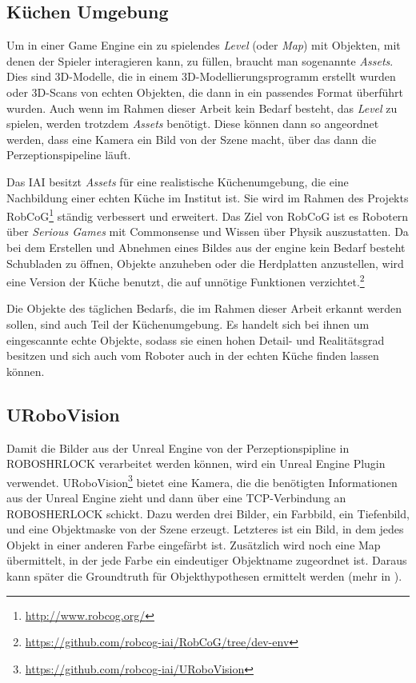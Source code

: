 \subsection{Küchen Umgebung}
\label{subsec:kitchenenvironment}
Um in einer Game Engine ein zu spielendes \textit{Level} (oder \textit{Map}) mit Objekten, mit denen der Spieler interagieren kann, zu füllen, braucht man sogenannte \textit{Assets}. Dies sind 3D-Modelle, die in einem 3D-Modellierungsprogramm erstellt wurden oder 3D-Scans von echten Objekten, die dann in ein passendes Format überführt wurden. Auch wenn im Rahmen dieser Arbeit kein Bedarf besteht, das \textit{Level} zu spielen, werden trotzdem \textit{Assets} benötigt. Diese können dann so angeordnet werden, dass eine Kamera ein Bild von der Szene macht, über das dann die Perzeptionspipeline läuft. \par
Das IAI besitzt \textit{Assets} für eine realistische Küchenumgebung, die eine Nachbildung einer echten Küche im Institut ist. Sie wird im Rahmen des Projekts RobCoG\footnote{\url{http://www.robcog.org/}} ständig verbessert und erweitert. Das Ziel von RobCoG ist es Robotern über \textit{Serious Games} mit Commonsense und Wissen über Physik auszustatten. Da bei dem Erstellen und Abnehmen eines Bildes aus der \acrshort{engine} kein Bedarf besteht Schubladen zu öffnen, Objekte anzuheben oder die Herdplatten anzustellen, wird eine Version der Küche benutzt, die auf unnötige Funktionen verzichtet.\footnote{\url{https://github.com/robcog-iai/RobCoG/tree/dev-env}} \par
Die Objekte des täglichen Bedarfs, die im Rahmen dieser Arbeit erkannt werden sollen, sind auch Teil der Küchenumgebung. Es handelt sich bei ihnen um eingescannte echte Objekte, sodass sie einen hohen Detail- und Realitätsgrad besitzen und sich auch vom Roboter auch in der echten Küche finden lassen können.
 
\subsection{URoboVision}
\label{subsec:urobovision}
Damit die Bilder aus der Unreal Engine von der Perzeptionspipline in ROBOSHRLOCK verarbeitet werden können, wird ein Unreal Engine Plugin verwendet. URoboVision\footnote{\url{https://github.com/robcog-iai/URoboVision}} bietet eine Kamera, die die benötigten Informationen aus der Unreal Engine zieht und dann über eine TCP-Verbindung an ROBOSHERLOCK schickt. Dazu werden drei Bilder, ein Farbbild, ein Tiefenbild, und eine Objektmaske von der Szene erzeugt. Letzteres ist ein Bild, in dem jedes Objekt in einer anderen Farbe eingefärbt ist. Zusätzlich wird noch eine Map übermittelt, in der jede Farbe ein eindeutiger Objektname zugeordnet ist. Daraus kann später die Groundtruth für Objekthypothesen  ermittelt werden (mehr in ).   


